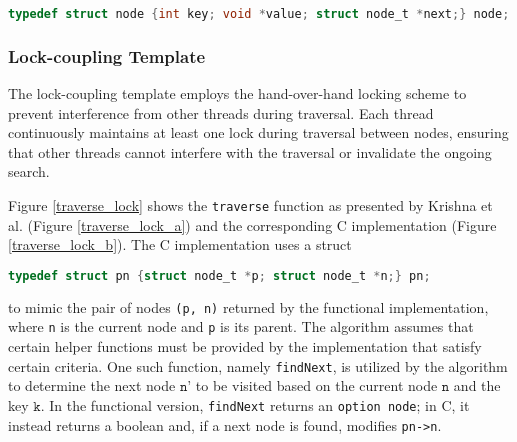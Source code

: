 \documentclass[a4paper,UKenglish,cleveref, autoref, thm-restate]{lipics-v2021}
\begin{document}
\begin{lstlisting}[language = C, backgroundcolor=\color{white}, basicstyle=\ttfamily\footnotesize]
typedef struct node {int key; void *value; struct node_t *next;} node;
\end{lstlisting}


\subsubsection{Lock-coupling Template}
The lock-coupling template employs the hand-over-hand locking scheme to prevent interference from other threads during traversal. Each thread continuously maintains at least one lock during traversal between nodes, ensuring that other threads cannot interfere with the traversal or invalidate the ongoing search.

Figure \ref{traverse_lock} shows the \lstinline{traverse} function as presented by Krishna et al. (Figure \ref{traverse_lock_a}) and the corresponding C implementation (Figure \ref{traverse_lock_b}). The C implementation uses a struct
\begin{lstlisting}[language = C, backgroundcolor=\color{white}, basicstyle=\ttfamily\footnotesize]
typedef struct pn {struct node_t *p; struct node_t *n;} pn;
\end{lstlisting}
to mimic the pair of nodes \lstinline{(p, n)} returned by the functional implementation, where \lstinline{n} is the current node and \lstinline{p} is its parent. The algorithm assumes that certain helper functions must be provided by the implementation that satisfy certain criteria. One such function, namely \lstinline{findNext}, is utilized by the algorithm to determine the next node $\texttt{n'}$ to be visited based on the current node $\texttt{n}$ and the key $\texttt{k}$. In the functional version, \lstinline{findNext} returns an \lstinline{option node}; in C, it instead returns a boolean and, if a next node is found, modifies \lstinline{pn->n}.
\end{document}
